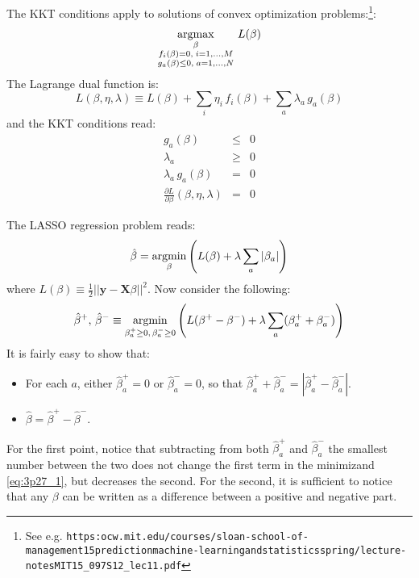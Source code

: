 

The KKT conditions apply to solutions of convex optimization problems:\footnote{See e.g.
    \texttt{https:\/\/ocw.mit.edu/courses/sloan-school-of-management\/15\-prediction\-machine-learning\-and\-statistics\-spring/lecture-notes\/MIT15\_097S12\_lec11.pdf}}:
\begin{eqnarray}\label{eq:3p27_0}
    \operatorname*{argmax}_{\substack{\beta\\f_i(\beta) = 0, \; i = 1, \ldots, M \\
    g_a(\beta) \leq 0, \; a = 1, \ldots, N}} \, L(\beta)
\end{eqnarray}
The Lagrange dual function is:
\begin{equation*}
L(\beta, \eta, \lambda) \equiv L(\beta) + \sum_i \eta_i \, f_i(\beta) + 
    \sum_a \lambda_a \, g_a(\beta)
\end{equation*}
and the KKT conditions read:
\begin{eqnarray} \label{eq:3p27_kkt1}
    g_a(\beta) & \leq & 0 \\
    \lambda_a & \geq & 0 \\
    \lambda_a \, g_a(\beta) & = & 0 \\ \label{eq:3p27_kkt4}
    \frac{\partial L}{\partial \beta}(\beta, \eta, \lambda) & = & 0
\end{eqnarray}

The LASSO regression problem reads:
\begin{eqnarray*}
    \hat{\beta} = \operatorname*{argmin}_\beta \left( L(\beta) + \lambda \sum_{a} |\beta_a|\right)
\end{eqnarray*}
where $L(\beta) \equiv \frac{1}{2}||\mathbf{y} - \mathbf{X} \beta||^2$.
Now consider the following:
\begin{equation}\label{eq:3p27_1}
\hat{\beta}^+, \, \hat{\beta}^- \equiv \operatorname*{argmin}_{\beta_a^+ \geq 0, \,\beta_a^- \geq 0} \left( L(\beta^+ - \beta^-) + \lambda \sum_{a} (\beta_a^+ + \beta_a^-)\right)
\end{equation}
It is fairly easy to show that:
\begin{itemize}
    \item For each $a$, either $\hat{\beta}_a^+ = 0$ or $\hat{\beta}_a^- = 0$,
      so that $\hat{\beta}_a^+ + \hat{\beta}_a^- = |\hat{\beta}_a^+ - \hat{\beta}_a^-|$.
    \item $\hat{\beta} = \hat{\beta}^+ - \hat{\beta}^-$.
\end{itemize}
For the first point, notice that subtracting from both $\hat{\beta}_a^+$ and 
$\hat{\beta}_a^-$ the smallest number between the two does not change the first
term in the minimizand \eqref{eq:3p27_1}, but decreases the second. For the second,
it is sufficient to notice that any $\beta$ can be written as a difference
between a positive and negative part.

